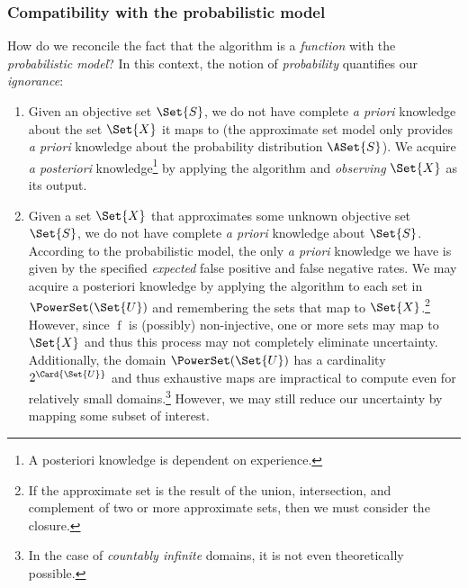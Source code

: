 \documentclass[ ../main.tex]{subfiles}
\begin{document}
\subsubsection{Compatibility with the probabilistic model}
How do we reconcile the fact that the algorithm is a \emph{function} with the 
\emph{probabilistic model}? In this context, the notion of \emph{probability} 
quantifies our \emph{ignorance}:
\begin{enumerate}
\item Given an objective set $\Set{S}$, we do not have complete \emph{a priori} 
knowledge about the set $\Set{X}$ it maps to (the approximate set model only 
provides \emph{a priori} knowledge about the probability distribution 
$\ASet{S}$). We acquire \emph{a posteriori} knowledge\footnote{A posteriori
knowledge is dependent on experience.} by applying the algorithm and 
\emph{observing} $\Set{X}$ as its output.
\item Given a set $\Set{X}$ that approximates some unknown objective set 
$\Set{S}$, we do not have complete \emph{a priori} knowledge about $\Set{S}$. 
According to the probabilistic model, the only \emph{a priori} knowledge we have 
is given by the specified \emph{expected} false positive and false negative 
rates. We may acquire a posteriori knowledge by applying the algorithm to each 
set in $\PowerSet(\Set{U})$ and remembering the sets that map to 
$\Set{X}$.\footnote{If the approximate set is the result of the union, 
intersection, and complement of two or more approximate sets, then we must 
consider the closure.}
However, since $\operatorname{f}$ is (possibly) non-injective, one or more sets 
may map to $\Set{X}$ and thus this process may not completely eliminate 
uncertainty. Additionally, the domain $\PowerSet(\Set{U})$ has a cardinality
$2^{\Card{\Set{U}}}$ and thus exhaustive maps are impractical to compute even 
for relatively small domains.\footnote{In the case of \emph{countably infinite} 
domains, it is not even theoretically possible.} However, we may still reduce 
our uncertainty by mapping some subset of interest.
\end{enumerate}
\end{document}
